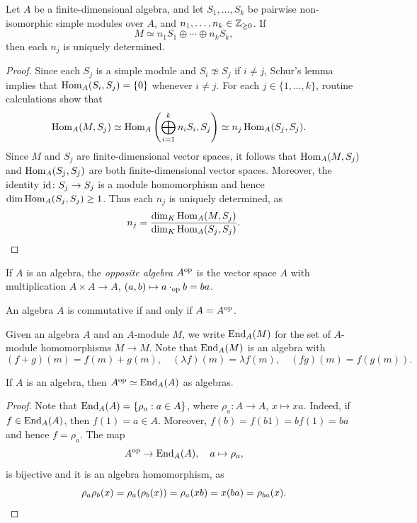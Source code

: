 \begin{theorem}
Let $A$ be a finite-dimensional algebra, and let 
$S_1,\dots,S_k$ be pairwise non-isomorphic simple modules over $A$, 
and $n_1,\dots,n_k\in\mathbb{Z}_{\geq0}$. 
If 
\[
M\simeq n_1S_1\oplus\cdots\oplus n_kS_k,
\]
then each $n_j$ is uniquely determined.  
\end{theorem}

\begin{proof}
	Since each $S_j$ is a simple module 
    and $S_i\not\simeq S_j$ if $i\ne j$, 
    Schur's lemma implies that 
	$\operatorname{Hom}_A(S_i,S_j)=\{0\}$ whenever $i\ne j$. 
	For each $j\in\{1,\dots,k\}$, routine calculations show that 
	\begin{align*}
		\operatorname{Hom}_A(M,S_j) &\simeq \operatorname{Hom}_A\left(\bigoplus_{i=1}^k n_i S_i,S_j\right)
		\simeq n_j\operatorname{Hom}_A(S_j,S_j). 
	\end{align*} 
	Since $M$ and $S_j$ are finite-dimensional vector spaces, it follows that
	$\operatorname{Hom}_A(M,S_j)$ and $\operatorname{Hom}_A(S_j,S_j)$ 
	are both finite-dimensional vector spaces.  
	Moreover, the identity $\operatorname{id}\colon S_j\to S_j$ 
	is a module homomorphism and hence  
	$\dim\operatorname{Hom}_A(S_j,S_j)\geq 1$. 
	Thus each $n_j$ is uniquely determined, as  
	\[ 
	n_j=\frac{\dim_K\operatorname{Hom}_A(M,S_j)}{\dim_K\operatorname{Hom}_A(S_j,S_j)}.\qedhere
	\]
\end{proof}

\begin{definition}
If $A$ is an algebra, the \emph{opposite algebra} $A^{\operatorname{op}}$ is the vector space 
$A$ with multiplication $A\times A\to A$, $(a,b)\mapsto a\cdot_{\operatorname{op}}b=ba$. 
\end{definition}

An algebra $A$ is commutative if and only if $A=A^{\operatorname{op}}$. 

Given an algebra $A$ and an $A$-module $M$, we write $\operatorname{End}_A(M)$ for the set of
$A$-module homomorphisms $M\to M$. Note that $\operatorname{End}_A(M)$ is an algebra
with
\[
  (f+g)(m)=f(m)+g(m),\quad 
  (\lambda f)(m)=\lambda f(m),\quad 
  (fg)(m)=f(g(m)).
\]

\begin{lemma}
	\label{lem:A^op}
    If $A$ is an algebra, then $A^{\operatorname{op}}\simeq\operatorname{End}_A(A)$ as algebras.  
\end{lemma}

\begin{proof}
	Note that $\operatorname{End}_A(A)=\{\rho_a:a\in A\}$, where $\rho_a\colon
	A\to A$, $x\mapsto xa$. Indeed, if $f\in\operatorname{End}_A(A)$, then 
	$f(1)=a\in A$. Moreover, $f(b)=f(b1)=bf(1)=ba$ and hence 
	$f=\rho_a$. The map 
    \[
    A^{\operatorname{op}}\to \operatorname{End}_A(A),\quad a\mapsto\rho_a,
    \]
	is bijective and it is an algebra homomorphism, as 
    \[
		\rho_a\rho_b(x)=\rho_a(\rho_b(x))=\rho_a(xb)=x(ba)=\rho_{ba}(x).\qedhere
    \]
\end{proof}


